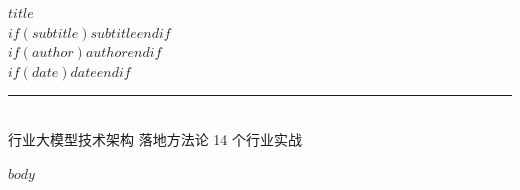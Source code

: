 \documentclass[11pt,a4paper,openany]{book}
\begin{document}
\begin{titlepage}
\begin{center}
\vspace*{2cm}
{\Huge\bfseries\color{oreilly-dark} $title$}\\[0.8cm]
{\LARGE\color{oreilly-blue} $if(subtitle)$$subtitle$$endif$}\\[2cm]
{\Large $if(author)$$author$$endif$}\\[1cm]
{\large $if(date)$$date$$endif$}\\[3cm]
\rule{\textwidth}{1pt}\\[0.5cm]
{\color{oreilly-gray}\large 行业大模型技术架构 \textperiodcentered{} 落地方法论 \textperiodcentered{} 14 个行业实战}
\vfill
\end{center}
\end{titlepage}

\frontmatter
\pagestyle{plain}
\tableofcontents
\clearpage

\mainmatter
\pagestyle{fancy}

$body$

\end{document}
